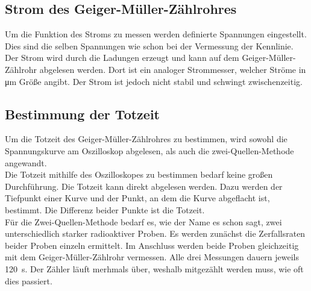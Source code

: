 \subsection{Strom des Geiger-Müller-Zählrohres}
Um die Funktion des Stroms zu messen werden definierte Spannungen eingestellt. Dies sind die selben Spannungen wie schon bei der 
Vermessung der Kennlinie. Der Strom wird durch die Ladungen erzeugt und kann auf dem Geiger-Müller-Zählrohr abgelesen werden. Dort 
ist ein analoger Strommesser, welcher Ströme in \unit{\micro\meter} Größe angibt. Der Strom ist jedoch nicht stabil und schwingt 
zwischenzeitig.

\subsection{Bestimmung der Totzeit}
Um die Totzeit des Geiger-Müller-Zählrohres zu bestimmen, wird sowohl die Spannungskurve am Oszilloskop abgelesen, als auch 
die zwei-Quellen-Methode angewandt. \\
\noindent Die Totzeit mithilfe des Oszilloskopes zu bestimmen bedarf keine großen Durchführung. Die Totzeit kann direkt abgelesen werden. 
Dazu werden der Tiefpunkt einer Kurve und der Punkt, an dem die Kurve abgeflacht ist, bestimmt. Die Differenz beider Punkte ist die Totzeit. \\
\noindent Für die Zwei-Quellen-Methode bedarf es, wie der Name es schon sagt, zwei unterschiedlich starker radioaktiver Proben. Es werden 
zunächst die Zerfallsraten beider Proben einzeln ermittelt. Im Anschluss werden beide Proben gleichzeitig mit dem Geiger-Müller-Zählrohr 
vermessen. Alle drei Messungen dauern jeweils \qty{120}{\second}.
Der Zähler läuft merhmals über, weshalb mitgezählt werden muss, wie oft dies passiert.


%

